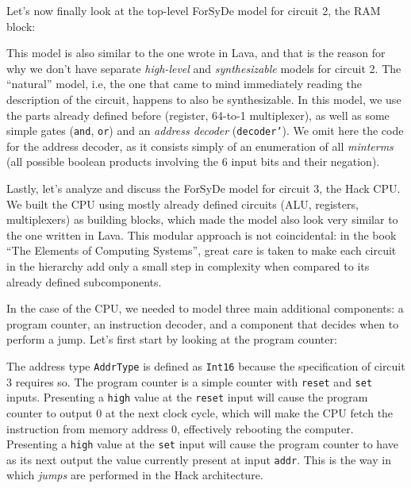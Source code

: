 \documentclass[a4paper]{article}
\begin{document}
                Let's now finally look at the top-level ForSyDe model for circuit 2, the RAM block:


                This model is also similar to the one wrote in Lava, and that is the
                reason for why we don't have separate \emph{high-level} and \emph{synthesizable}
                models for circuit 2. The ``natural'' model, i.e, the one that came to mind
                immediately reading the description of the circuit, happens to also be
                synthesizable. In this model, we use the parts already defined before (register,
                64-to-1 multiplexer), as well as some simple gates (\texttt{and}, \texttt{or}) and
                an \emph{address decoder} (\texttt{decoder'}). We omit here the code for the address
                decoder, as it consists simply of an enumeration of all \emph{minterms} (all
                possible boolean products involving the 6 input bits and their negation).

                Lastly, let's analyze and discuss the ForSyDe model for circuit 3, the Hack CPU. We
                built the CPU using mostly already defined circuits (ALU, registers, multiplexers)
                as building blocks, which made the model also look very similar to the one written
                in Lava. This modular approach is not coincidental: in the book ``The Elements of
                Computing Systems''\cite{nand2tetris-book}, great care is taken to make each circuit
                in the hierarchy add only a small step in complexity when compared to its already
                defined subcomponents.

                In the case of the CPU, we needed to model three main additional components: a
                program counter, an instruction decoder, and a component that decides when to
                perform a jump. Let's first start by looking at the program counter:


                The address type \texttt{AddrType} is defined as \texttt{Int16} because the
                specification of circuit 3 requires so. The program counter is a simple counter with
                \texttt{reset} and \texttt{set} inputs. Presenting a \texttt{high} value at the
                \texttt{reset} input will cause the program counter to output 0 at the next clock
                cycle, which will make the CPU fetch the instruction from memory address 0,
                effectively rebooting the computer. Presenting a \texttt{high} value at the
                \texttt{set} input will cause the program counter to have as its next output the
                value currently present at input \texttt{addr}. This is the way in which
                \emph{jumps} are performed in the Hack architecture.
\end{document}
